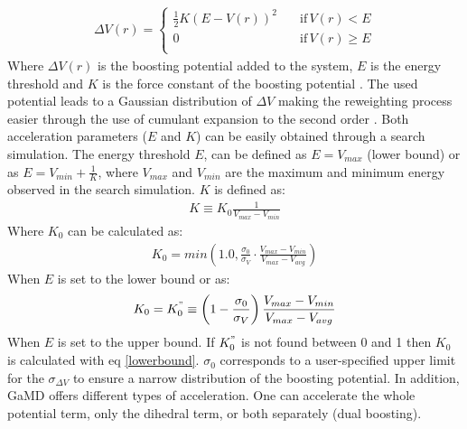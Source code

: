 \begin{equation}
  \begin{aligned}
\Delta V(r) =\begin{cases}
          \frac{1}{2} K \left ( E - V(r) \right )^2 \quad &\text{if} \, V(r) < E \\
          0 \quad &\text{if} \, V(r) \geq E \\
     \end{cases}
  \end{aligned}
\end{equation}
Where $\Delta V(r)$ is the boosting potential added to the system, $E$ is the energy threshold and $K$ is the force constant of the boosting potential \cite{miao2015gaussian}. The used potential leads to a Gaussian distribution of $\Delta V$ making the reweighting process easier through the use of cumulant expansion to the second order \cite{miao2014improved}. Both acceleration parameters ($E$ and $K$) can be easily obtained through a search simulation. The energy threshold $E$, can be defined as $E = V_{max}$ (lower bound) or as $E = V_{min} + \frac{1}{K}$, where $V_{max}$ and $V_{min}$ are the maximum and minimum energy observed in the search simulation. $K$ is defined as: 
\begin{equation}
  \begin{aligned}
  K \equiv K_0 \frac{1}{V_{max} - V_{min}}
    \end{aligned}
\end{equation}
Where $K_0$ can be calculated as:
\begin{equation}
\label{lowerbound}
  \begin{aligned}
K_0 = min\left(1.0, \frac{\sigma_0}{\sigma_V} · \frac{V_{max} - V_{min}}{V_{max} - V_{avg}}\right)
    \end{aligned}
\end{equation}
When $E$ is set to the lower bound or as:
\begin{equation}
  \begin{aligned}
K_0 = K_{0}^{"} \equiv \left(1 - \frac{\sigma_0}{\sigma_V}\right)\frac{V_{max} - V_{min}}{V_{max} - V_{avg}}
  \end{aligned}
\end{equation}
When $E$ is set to the upper bound. If $K_{0}^{"}$ is not found between 0 and 1 then $K_0$ is calculated with eq \eqref{lowerbound}. $\sigma_0$ corresponds to a user-specified upper limit for the $\sigma_{\Delta V}$ to ensure a narrow distribution of the boosting potential. In addition, GaMD offers different types of acceleration. One can accelerate the whole potential term, only the dihedral term, or both separately (dual boosting).

